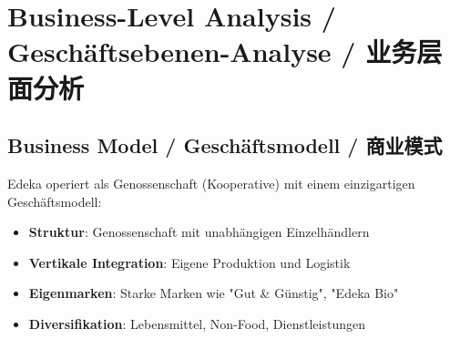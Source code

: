 \chapter{Business-Level Analysis / Geschäftsebenen-Analyse / 业务层面分析}

\section{Business Model / Geschäftsmodell / 商业模式}

\begin{otherlanguage}{ngerman}
Edeka operiert als Genossenschaft (Kooperative) mit einem einzigartigen Geschäftsmodell:
\begin{itemize}
    \item \textbf{Struktur}: Genossenschaft mit unabhängigen Einzelhändlern
    \item \textbf{Vertikale Integration}: Eigene Produktion und Logistik
    \item \textbf{Eigenmarken}: Starke Marken wie "Gut \& Günstig", "Edeka Bio"
    \item \textbf{Diversifikation}: Lebensmittel, Non-Food, Dienstleistungen
\end{itemize}
\end{otherlanguage}

